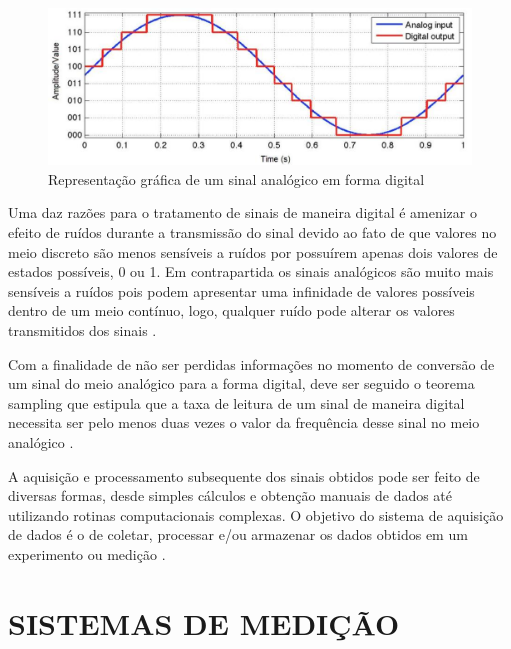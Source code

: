 \begin{figure}[htb]
	\caption{\label{fig:1120} Representação gráfica de um sinal analógico em forma digital}
	\begin{center}
		\includegraphics[width=\textwidth]{pictures/1120.png}
	\end{center}
\end{figure}

Uma daz razões para o tratamento de sinais de maneira digital é amenizar o efeito de ruídos durante a transmissão do sinal devido ao fato de que valores no meio discreto
são menos sensíveis a ruídos por possuírem apenas dois valores de estados possíveis, 0 ou 1.
Em contrapartida os sinais analógicos são muito mais sensíveis a ruídos pois podem apresentar uma infinidade de valores possíveis dentro de um meio contínuo,
logo, qualquer ruído pode alterar os valores transmitidos dos sinais \autocite{Hollman2011}.

Com a finalidade de não ser perdidas informações no momento de conversão de um sinal do meio analógico para a forma digital, deve ser seguido o teorema sampling que estipula
que a taxa de leitura de um sinal de maneira digital necessita ser pelo menos duas vezes o valor da frequência desse sinal no meio analógico \autocite{Hollman2011}.

A aquisição e processamento subsequente dos sinais obtidos pode ser feito de diversas formas, desde simples cálculos e obtenção manuais de dados até utilizando
rotinas computacionais complexas. O objetivo do sistema de aquisição de dados é o de coletar, processar e/ou armazenar os dados obtidos em um experimento ou medição
\autocite{Hollman2011}.

\section{SISTEMAS DE MEDIÇÃO}

